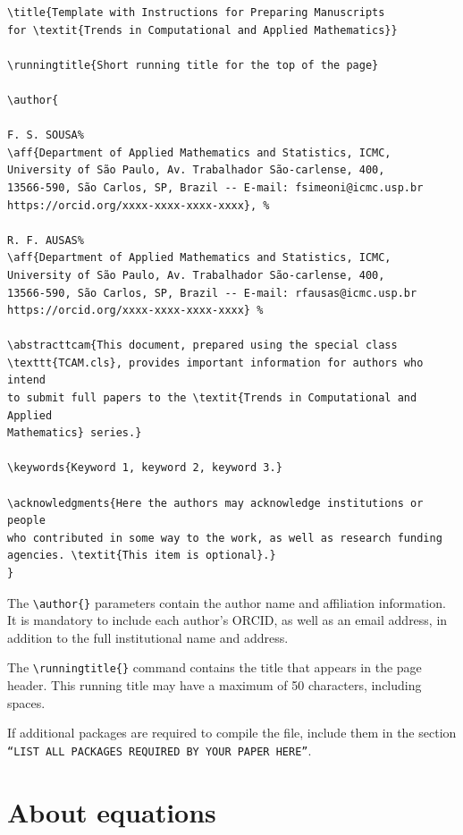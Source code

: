 \documentclass[english]{TCAM} %
\begin{document}
\begin{framed}
\begin{verbatim}
\title{Template with Instructions for Preparing Manuscripts
for \textit{Trends in Computational and Applied Mathematics}}

\runningtitle{Short running title for the top of the page}

\author{

F. S. SOUSA%
\aff{Department of Applied Mathematics and Statistics, ICMC,
University of São Paulo, Av. Trabalhador São-carlense, 400,
13566-590, São Carlos, SP, Brazil -- E-mail: fsimeoni@icmc.usp.br
https://orcid.org/xxxx-xxxx-xxxx-xxxx}, %

R. F. AUSAS%
\aff{Department of Applied Mathematics and Statistics, ICMC,
University of São Paulo, Av. Trabalhador São-carlense, 400,
13566-590, São Carlos, SP, Brazil -- E-mail: rfausas@icmc.usp.br
https://orcid.org/xxxx-xxxx-xxxx-xxxx} %

\abstracttcam{This document, prepared using the special class
\texttt{TCAM.cls}, provides important information for authors who intend
to submit full papers to the \textit{Trends in Computational and Applied
Mathematics} series.}

\keywords{Keyword 1, keyword 2, keyword 3.}

\acknowledgments{Here the authors may acknowledge institutions or people
who contributed in some way to the work, as well as research funding
agencies. \textit{This item is optional}.}
}
\end{verbatim}
\end{framed}

The \verb|\author{}| parameters contain the author name and affiliation information. It is mandatory to include each author's ORCID, as well as an email address, in addition to the full institutional name and address.

The \verb|\runningtitle{}| command contains the title that appears in the page header. This running title may have a maximum of 50 characters, including spaces.

If additional packages are required to compile the file, include them in the section \texttt{``LIST ALL PACKAGES REQUIRED BY YOUR PAPER HERE''}.


\section{About equations}
\end{document}
